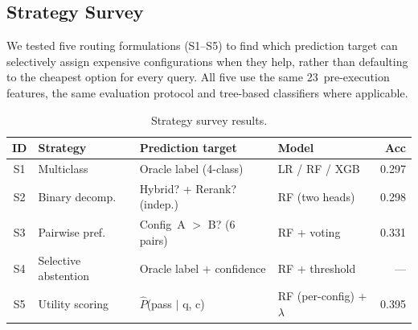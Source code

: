 


\subsection{Strategy Survey}
\label{subsec:strategy-survey}

We tested five routing formulations
(S1--S5) to find which prediction target can selectively assign
expensive configurations when they help, rather than defaulting to
the cheapest option for every query. All five use the same 23~pre-execution features,
the same evaluation protocol and tree-based classifiers where
applicable. 

\begin{table}[h!]
\centering
\small
\begin{tabular}{c l l l r}
\hline
\textbf{ID} & \textbf{Strategy} & \textbf{Prediction target} & \textbf{Model} & \textbf{Acc} \\
\hline
S1 & Multiclass          & Oracle label (4-class)        & LR / RF / XGB          & 0.297 \\
S2 & Binary decomp.      & Hybrid? + Rerank? (indep.)    & RF (two heads)         & 0.298 \\
S3 & Pairwise pref.      & Config~A $>$ B? (6 pairs)     & RF + voting            & 0.331 \\
S4 & Selective abstention & Oracle label + confidence     & RF + threshold         & ---   \\
S5 & Utility scoring     & $\hat{P}$(pass $\mid$ q, c)   & RF (per-config) + $\lambda$ & 0.395 \\
\hline
\end{tabular}
\caption{Strategy survey results.}
\label{tab:strategy-survey}
\end{table}

